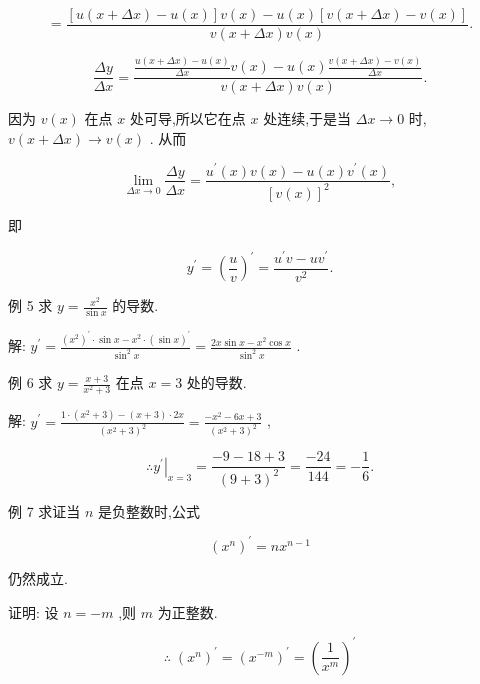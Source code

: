 \documentclass[lang=cn,newtx,12pt,scheme=chinese]{elegantbook}
\begin{document}
\[
= \frac{\left\lbrack {u\left( {x + {\Delta x}}\right) - u\left( x\right) }\right\rbrack v\left( x\right) - u\left( x\right) \left\lbrack {v\left( {x + {\Delta x}}\right) - v\left( x\right) }\right\rbrack }{v\left( {x + {\Delta x}}\right) v\left( x\right) }.
\]

\[
\frac{\Delta y}{\Delta x} = \frac{\frac{u\left( {x + {\Delta x}}\right) - u\left( x\right) }{\Delta x}v\left( x\right) - u\left( x\right) \frac{v\left( {x + {\Delta x}}\right) - v\left( x\right) }{\Delta x}}{v\left( {x + {\Delta x}}\right) v\left( x\right) }.
\]

因为 \(v\left( x\right)\) 在点 \(x\) 处可导,所以它在点 \(x\) 处连续,于是当 \({\Delta x} \rightarrow 0\) 时, \(v\left( {x + {\Delta x}}\right) \rightarrow v\left( x\right)\) . 从而

\[
\mathop{\lim }\limits_{{{\Delta x} \rightarrow 0}}\frac{\Delta y}{\Delta x} = \frac{{u}^{\prime }\left( x\right) v\left( x\right) - u\left( x\right) {v}^{\prime }\left( x\right) }{{\left\lbrack v\left( x\right) \right\rbrack }^{2}},
\]

即

\[
{y}^{\prime } = {\left( \frac{u}{v}\right) }^{\prime } = \frac{{u}^{\prime }v - u{v}^{\prime }}{{v}^{2}}.
\]

例 5 求 \(y = \frac{{x}^{2}}{\sin x}\) 的导数.

解: \({y}^{\prime } = \frac{{\left( {x}^{2}\right) }^{\prime } \cdot \sin x - {x}^{2} \cdot {\left( \sin x\right) }^{\prime }}{{\sin }^{2}x} = \frac{{2x}\sin x - {x}^{2}\cos x}{{\sin }^{2}x}\) .

例 6 求 \(y = \frac{x + 3}{{x}^{2} + 3}\) 在点 \(x = 3\) 处的导数.

解: \({y}^{\prime } = \frac{1 \cdot \left( {{x}^{2} + 3}\right) - \left( {x + 3}\right) \cdot {2x}}{{\left( {x}^{2} + 3\right) }^{2}} = \frac{-{x}^{2} - {6x} + 3}{{\left( {x}^{2} + 3\right) }^{2}}\) ,

\[
\therefore {\left. {y}^{\prime }\right| }_{x = 3} = \frac{-9 - {18} + 3}{{\left( 9 + 3\right) }^{2}} = \frac{-{24}}{144} = - \frac{1}{6}\text{.}
\]

例 7 求证当 \(n\) 是负整数时,公式

\[
{\left( {x}^{n}\right) }^{\prime } = n{x}^{n - 1}
\]

仍然成立.

证明: 设 \(n = - m\) ,则 \(m\) 为正整数.

\[
\therefore \;{\left( {x}^{n}\right) }^{\prime } = {\left( {x}^{-m}\right) }^{\prime } = {\left( \frac{1}{{x}^{m}}\right) }^{\prime }
\]
\end{document}
